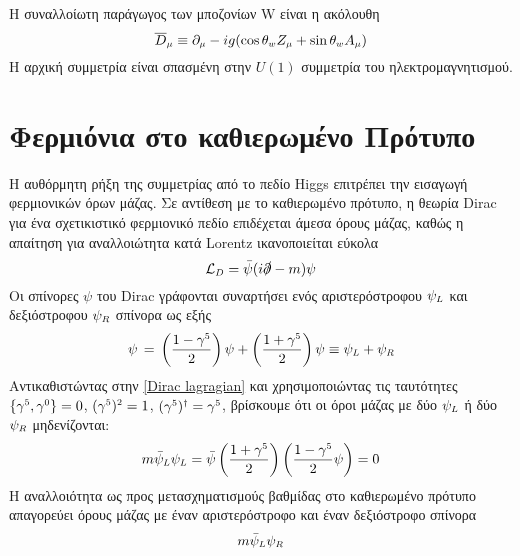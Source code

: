 Η συναλλοίωτη παράγωγος των μποζονίων W είναι η ακόλουθη
\begin{equation*}
    \overline{D}\subscr{\mu}\equiv\partial\subscr{\mu}-ig(\cos\theta\subscr{w}Z\subscr{\mu}+\sin\theta\subscr{w}A\subscr{\mu})
\end{equation*}
Η αρχική συμμετρία είναι σπασμένη στην $U(1)$ συμμετρία του ηλεκτρομαγνητισμού.

\section{Φερμιόνια στο καθιερωμένο Πρότυπο}
Η αυθόρμητη ρήξη της συμμετρίας από το πεδίο Higgs επιτρέπει την εισαγωγή φερμιονικών όρων μάζας. 
Σε αντίθεση με το καθιερωμένο πρότυπο, η θεωρία Dirac για ένα σχετικιστικό φερμιονικό πεδίο επιδέχεται άμεσα όρους μάζας, καθώς η απαίτηση για αναλλοιώτητα κατά Lorentz ικανοποιείται εύκολα
\begin{equation}\label{Dirac lagragian}
    \mathcal{L}\subscr{D}=\Bar{\psi}(i\slashed{\partial}-m)\psi
\end{equation}
Οι σπίνορες $\psi$ του Dirac γράφονται συναρτήσει ενός αριστερόστροφου $\psi\subscr{L}$ και δεξιόστροφου $\psi\subscr{R}$ σπίνορα ως εξής
\begin{equation}
    \psi\,=\, \left( \frac{1-\gamma\superscr{5}}{2} \right)\psi+\left( \frac{1+\gamma\superscr{5}}{2} \right)\psi \equiv \psi\subscr{L}+\psi\subscr{R}
\end{equation}
Αντικαθιστώντας στην \eqref{Dirac lagragian} και χρησιμοποιώντας τις ταυτότητες $\{\gamma\superscr{5},\gamma\superscr{0}\}=0$, $(\gamma\superscr{5})\superscr{2}=1$, $(\gamma\superscr{5})\superscr{\dagger}=\gamma\superscr{5}$, βρίσκουμε ότι οι όροι μάζας με δύο $\psi\subscr{L}$ ή δύο $\psi\subscr{R}$ μηδενίζονται:
\begin{equation}
    m\Bar{\psi}\subscr{L}\psi\subscr{L}=\Bar{\psi}\left( \frac{1+\gamma\superscr{5}}{2} \right)\left( \frac{1-\gamma\superscr{5}}{2}\psi \right) = 0
\end{equation}
Η αναλλοιότητα ως προς μετασχηματισμούς βαθμίδας στο καθιερωμένο πρότυπο απαγορεύει όρους μάζας με έναν αριστερόστροφο και έναν δεξιόστροφο σπίνορα
\begin{equation}\label{dirac mass terms}
    m\bar{\psi}\subscr{L}\psi\subscr{R}
\end{equation}
